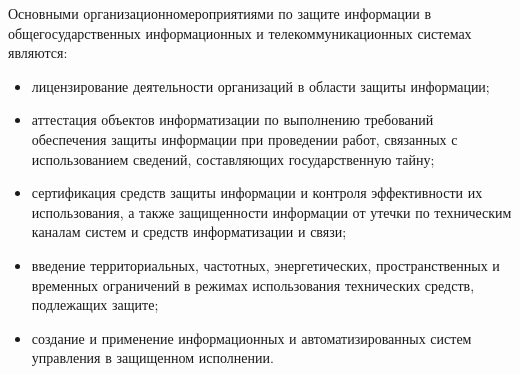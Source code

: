 Основными организационно мероприятиями по защите информации в общегосударственных информационных и телекоммуникационных системах являются:
\begin{itemize}
	\item лицензирование деятельности организаций в области защиты информации;
	\item аттестация объектов информатизации по выполнению требований обеспечения защиты информации при проведении работ, связанных с использованием сведений, составляющих государственную тайну;
	\item сертификация средств защиты информации и контроля эффективности их использования, а также защищенности информации от утечки по техническим каналам систем и средств информатизации и связи;
	\item введение территориальных, частотных, энергетических, пространственных и временных ограничений в режимах использования технических средств, подлежащих защите;
	\item создание и применение информационных и автоматизированных систем управления в защищенном исполнении.
\end{itemize}